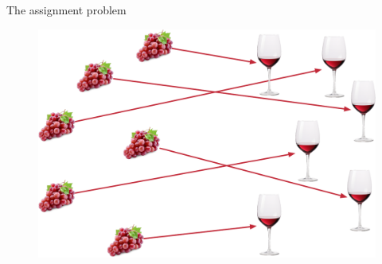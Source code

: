 \documentclass[pdf,aspectratio=169,10pt]{beamer}
\begin{document}
{
\begin{frame}[plain]
\end{frame}
}



\begin{frame}{The assignment problem}
    \begin{figure}
        \includegraphics[height=0.7\textheight]{../img/wine_assignment.pdf}  
    \end{figure}
\end{frame}
\end{document}
